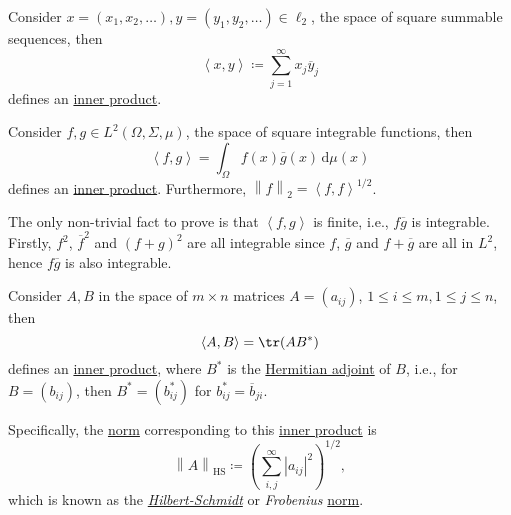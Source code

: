 \begin{eg}
	Consider \(x=(x_1, x_2, \ldots ), y=(y_1, y_2, \ldots )\in \ell _2\), the space of square summable sequences, then
	\[
		\left\langle x, y \right\rangle \coloneqq \sum_{j=1}^{\infty} x_j \overline{y} _j
	\]
	defines an \hyperref[def:inner-product]{inner product}.
\end{eg}

\begin{eg}
	Consider \(f, g\in L^2(\Omega , \Sigma , \mu )\), the space of square integrable functions, then
	\[
		\left\langle f, g \right\rangle = \int _\Omega f(x) \overline{g} (x)\,\mathrm{d} \mu (x)
	\]
	defines an \hyperref[def:inner-product]{inner product}. Furthermore, \(\left\lVert f\right\rVert _2 = \left\langle f, f \right\rangle ^{1 / 2}\).
\end{eg}
\begin{explanation}
	The only non-trivial fact to prove is that \(\left\langle f, g \right\rangle \) is finite, i.e., \(f \overline{g} \) is integrable. Firstly, \(f^{2} \), \(\overline{f} ^{2} \) and \((f + g)^{2} \) are all integrable since \(f\), \(\overline{g} \) and \(f+\overline{g} \) are all in \(L^2\), hence \(f \overline{g} \) is also integrable.
\end{explanation}

\begin{eg}
	Consider \(A, B\) in the space of \(m \times n\) matrices \(A = (a_{ij} )\), \(1 \leq i\leq m, 1 \leq j\leq n\), then
	\[
		\left\langle A, B \right\rangle = \tr(A B^{\ast})
	\]
	defines an \hyperref[def:inner-product]{inner product}, where \(B^{\ast} \) is the \href{https://en.wikipedia.org/wiki/Hermitian_adjoint}{Hermitian adjoint} of \(B\), i.e., for \(B = (b_{ij})\), then \(B^{\ast} = (b^{\ast} _{ij})\) for \(b^{\ast} _{ij} = \overline{b}_{ji}\).

	\begin{remark}
		Specifically, the \hyperref[def:norm]{norm} corresponding to this \hyperref[def:inner-product]{inner product} is
		\[
			\left\lVert A\right\rVert _{\mathrm{HS} }\coloneqq \left(\sum_{i, j}^{\infty} \left\vert a_{ij}  \right\vert ^{2} \right)^{1 / 2},
		\]
		which is known as the \href{https://en.wikipedia.org/wiki/Hilbert%E2%80%93Schmidt_operator}{\emph{Hilbert-Schmidt}} or \emph{Frobenius} \hyperref[def:norm]{norm}.
	\end{remark}
\end{eg}

